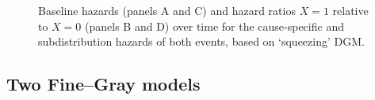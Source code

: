\documentclass[
  letterpaper,
  DIV=11,
  numbers=noendperiod]{scrreprt}
\begin{document}
\begin{figure}


\caption{\label{fig-squeeze}Baseline hazards (panels A and C) and hazard
ratios \(X = 1\) relative to \(X = 0\) (panels B and D) over time for
the cause-specific and subdistribution hazards of both events, based on
`squeezing' DGM.}

\end{figure}%

\subsection{Two Fine--Gray models}\label{two-finegray-models}
\end{document}
